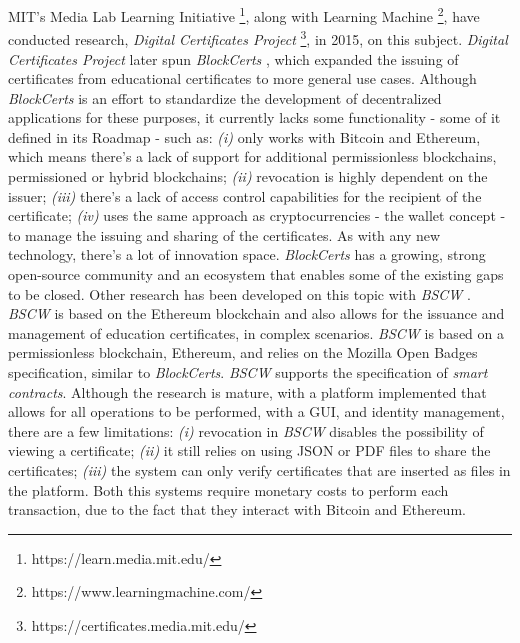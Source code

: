 MIT's Media Lab Learning Initiative \footnote{https://learn.media.mit.edu/}, along with Learning Machine \footnote{https://www.learningmachine.com/}, have conducted research, \textit{Digital Certificates Project} \footnote{https://certificates.media.mit.edu/}, in 2015, on this subject. \textit{Digital Certificates Project} later spun \textit{BlockCerts} \cite{Blockcerts}, which expanded the issuing of certificates from educational certificates to more general use cases. Although \textit{BlockCerts} is an effort to standardize the development of decentralized applications for these purposes, it currently lacks some functionality - some of it defined in its Roadmap - such as: \emph{(i)} only works with Bitcoin and Ethereum, which means there's a lack of support for additional permissionless blockchains, permissioned or hybrid blockchains; \emph{(ii)} revocation is highly dependent on the issuer; \emph{(iii)} there's a lack of access control capabilities for the recipient of the certificate; \emph{(iv)} uses the same approach as cryptocurrencies - the wallet concept - to manage the issuing and sharing of the certificates. As with any new technology, there's a lot of innovation space. \textit{BlockCerts} has a growing, strong open-source community and an ecosystem that enables some of the existing gaps to be closed. Other research has been developed on this topic with \emph{BSCW} \cite{grather_blockchain_2018}. \emph{BSCW} is based on the Ethereum blockchain and also allows for the issuance and management of education certificates, in complex scenarios. \emph{BSCW} is based on a permissionless blockchain, Ethereum, and relies on the Mozilla Open Badges specification, similar to \emph{BlockCerts}. \emph{BSCW} supports the specification of \emph{smart contracts}. Although the research is mature, with a platform implemented that allows for all operations to be performed, with a GUI, and identity management, there are a few limitations: \emph{(i)} revocation in \emph{BSCW} disables the possibility of viewing a certificate; \emph{(ii)} it still relies on using JSON or PDF files to share the certificates; \emph{(iii)} the system can only verify certificates that are inserted as files in the platform. Both this systems require monetary costs to perform each transaction, due to the fact that they interact with Bitcoin and Ethereum.